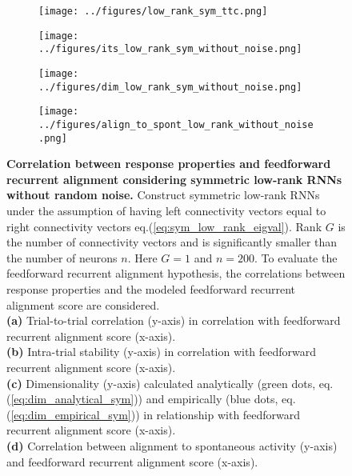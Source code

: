 \documentclass[11pt]{article}
\begin{document}
%	
		\begin{figure}[H]
			\centering
			\begin{subfigure}[b]{0.45\textwidth}
				\texttt{[image: ../figures/low\_rank\_sym\_ttc.png]}
				\caption{}
			\end{subfigure}
			\hfill
			\begin{subfigure}[b]{0.45\textwidth}
				\texttt{[image: ../figures/its\_low\_rank\_sym\_without\_noise.png]}
				\caption{}
			\end{subfigure}
			\newline
			\begin{subfigure}[b]{0.45\textwidth}
				\texttt{[image: ../figures/dim\_low\_rank\_sym\_without\_noise.png]}
				\caption{}
			\end{subfigure}
			\hfill
			\begin{subfigure}[b]{0.45\textwidth}
				\texttt{[image: ../figures/align\_to\_spont\_low\_rank\_without\_noise.png]}
				\caption{}
			\end{subfigure}
			\caption[Correlation between response properties and feedforward recurrent alignment considering symmetric low-rank RNNs without random noise]{\textbf{Correlation between response properties and feedforward recurrent alignment considering symmetric low-rank RNNs without random noise.} Construct symmetric low-rank RNNs under the assumption of having left connectivity vectors equal to right connectivity vectors eq.(\ref{eq:sym_low_rank_eigval}). Rank $G$ is the number of connectivity vectors and is significantly smaller than the number of neurons $n$. Here $G = 1$ and $n = 200$. To evaluate the feedforward recurrent alignment hypothesis, the correlations between response properties and the modeled feedforward recurrent alignment score are considered. \\
			\textbf{(a)} Trial-to-trial correlation (y-axis) in correlation with feedforward recurrent alignment score (x-axis).\\
			\textbf{(b)} Intra-trial stability (y-axis) in correlation with feedforward recurrent alignment score (x-axis).\\
			\textbf{(c)} Dimensionality (y-axis) calculated analytically (green dots, eq.(\ref{eq:dim_analytical_sym})) and empirically (blue dots, eq.(\ref{eq:dim_empirical_sym})) in relationship with feedforward recurrent alignment score (x-axis).\\
			\textbf{(d)} Correlation between alignment to spontaneous activity (y-axis) and feedforward recurrent alignment score (x-axis).}
		

\end{figure}
\end{document}
